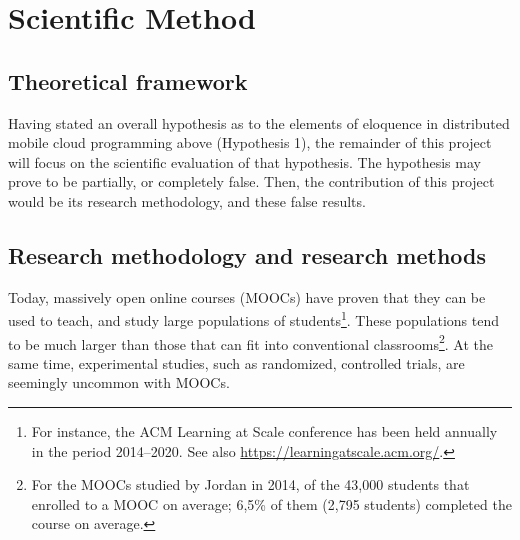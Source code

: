 \section{Scientific Method}

\label{sec:scientific-method}


\subsection{Theoretical framework}

Having stated an overall hypothesis as to the elements of eloquence in
distributed mobile cloud programming above (Hypothesis 1), the
remainder of this project will focus on the scientific evaluation of
that hypothesis. The hypothesis may prove to be partially, or
completely false. Then, the contribution of this project would be its
research methodology, and these false results.




\subsection{Research methodology and research methods}

Today, massively open online courses (MOOCs) have proven that they can
be used to teach, and study large populations of students\footnote{For
instance, the ACM Learning at Scale conference has been held annually
in the period 2014--2020. See also
\url{https://learningatscale.acm.org/}.}. These populations tend to
be much larger than those that can fit into conventional
classrooms\footnote{For the MOOCs studied by Jordan in
2014\cite{2014-Jordan}, of the 43,000 students that enrolled to a MOOC
on average; 6,5\% of them (2,795 students) completed the course on
average.}. At the same time, experimental studies, such as randomized,
controlled trials, are seemingly uncommon with
MOOCs\cite{2015-Rebooting-MOOC-Research}.

